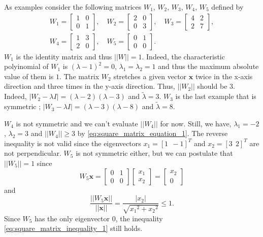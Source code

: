 \documentclass[12pt]{report}
\numberwithin{figure}{chapter}
\theoremstyle{plain}
\theoremstyle{definition}
\theoremstyle{corollary}
\theoremstyle{definition}
\theoremstyle{plain}
\theoremstyle{definition}
\theoremstyle{plain}
\newcommand\bx{\ensuremath{\boldsymbol x}}
\begin{document}
As examples consider the following matrices \(W_1\), \(W_2\), \(W_3\), \(W_4\), \(W_5\) defined by
\begin{gather*}
W_1=\begin{bmatrix}
1&0\\0&1
\end{bmatrix},\quad
W_2=\begin{bmatrix}
2&0\\0&3
\end{bmatrix},\quad
W_3=\begin{bmatrix}
4&2\\2&7
\end{bmatrix},\\
W_4=\begin{bmatrix}
1&3\\2&0
\end{bmatrix},\quad
W_5=\begin{bmatrix}
0&1\\0&0
\end{bmatrix}.\quad
\end{gather*}
\(W_1\) is the identity matrix and thus \(||W||=1\).
Indeed, the characteristic polyinomial of \(W_1\) is \((\lambda-1)^2=0\), \(\lambda_1=\lambda_2=1\) and thus the maximum absolute value of them is \(1\).
The matrix \(W_2\) stretches a given vector \(\bx\) twice in the x-axis direction and three times in the y-axis direction.
Thus, \(||W_2||\) should be \(3\).
Indeed, \(|W_2-\lambda I|=(\lambda-2)(\lambda-3)\) and \(\tilde\lambda=3\).
\(W_3\) is the last example that is symmetric ; \(|W_3-\lambda I|=(\lambda-3)(\lambda-8)\) and \(\tilde\lambda=8\).

\(W_4\) is not symmetric and we can't evaluate \(||W_4||\) for now.
Still, we have, \(\lambda_1=-2\), \(\lambda_2=3\) and \(||W_4||\ge3\) by \eqref{eq:square_matrix_equation_1}.
The reverse inequality is not valid since the eigenvectors \(x_1=[1\:\:-1]^T\) and \(x_2=[3\:\:2]^T\) are not perpendicular.
\(W_5\) is not symmetric either, but we can postulate that \(||W_5||=1\) since
\[
W_5\bx=
\begin{bmatrix}
0&1\\0&0
\end{bmatrix}
\begin{bmatrix}
x_1\\x_2
\end{bmatrix}
=
\begin{bmatrix}
x_2\\0
\end{bmatrix}
\]
and
\[
\frac{||W_5\bx||}{||\bx||}=\frac{|x_2|}{\sqrt{{x_1}^2+{x_2}^2}}\le 1.
\]
Since \(W_5\) has the only eigenvector \(0\), the inequality \eqref{eq:square_matrix_inequality_1} still holds.
\end{document}
